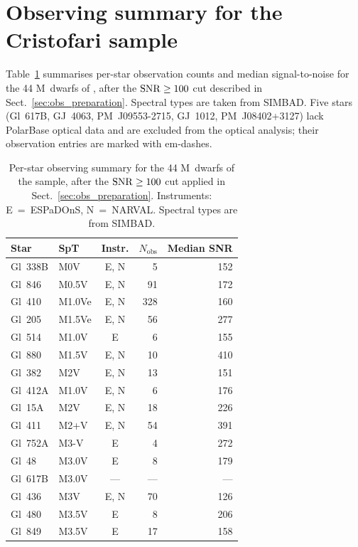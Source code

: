 \section{Observing summary for the Cristofari sample}
\label{app:obs_summary}

Table~\ref{tab:obs_summary_full} summarises per-star observation counts and median signal-to-noise for the 44 M~dwarfs of \citet{cristofari+2022b}, after the ${\rm SNR}\geq100$ cut described in Sect.~\ref{sec:obs_preparation}. Spectral types are taken from SIMBAD. Five stars (Gl~617B, GJ~4063, PM~J09553-2715, GJ~1012, PM~J08402+3127) lack PolarBase optical data and are excluded from the optical analysis; their observation entries are marked with em-dashes.

\begin{table}
\centering
\caption{Per-star observing summary for the 44 M~dwarfs of the \citet{cristofari+2022b} sample, after the ${\rm SNR}\geq100$ cut applied in Sect.~\ref{sec:obs_preparation}. Instruments: E~=~ESPaDOnS, N~=~NARVAL. Spectral types are from SIMBAD.}
\label{tab:obs_summary_full}
\begin{tabular}{l l c r r}
\toprule
Star & SpT & Instr. & $N_{\mathrm{obs}}$ & Median SNR \\
\midrule
Gl~338B        & M0V    & E, N & 5   & 152 \\
Gl~846         & M0.5V  & E, N & 91  & 172 \\
Gl~410         & M1.0Ve & E, N & 328 & 160 \\
Gl~205         & M1.5Ve & E, N & 56  & 277 \\
Gl~514         & M1.0V  & E    & 6   & 155 \\
Gl~880         & M1.5V  & E, N & 10  & 410 \\
Gl~382         & M2V    & E, N & 13  & 151 \\
Gl~412A        & M1.0V  & E, N & 6   & 176 \\
Gl~15A         & M2V    & E, N & 18  & 226 \\
Gl~411         & M2+V   & E, N & 54  & 391 \\
Gl~752A        & M3-V   & E    & 4   & 272 \\
Gl~48          & M3.0V  & E    & 8   & 179 \\
Gl~617B        & M3.0V  & ---  & --- & --- \\
Gl~436         & M3V    & E, N & 70  & 126 \\
Gl~480         & M3.5V  & E    & 8   & 206 \\
Gl~849         & M3.5V  & E    & 17  & 158 \\

\end{tabular}
\end{table}
